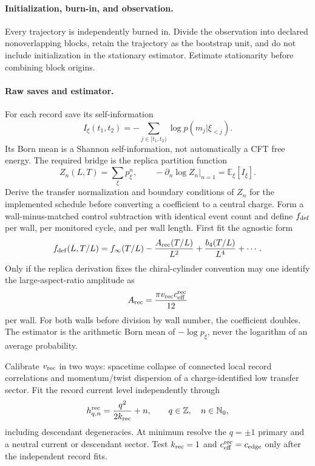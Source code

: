 \documentclass[aps,prx,onecolumn,nofootinbib,superscriptaddress,longbibliography]{revtex4-2}
\newcommand{\mb}[1]{\mathbb{#1}}
\newcommand{\E}{\mathbb{E}}
\begin{document}
\paragraph{Initialization, burn-in, and observation.}
Every trajectory is independently burned in.  Divide the observation into declared
nonoverlapping blocks, retain the trajectory as the bootstrap unit, and do not include
initialization in the stationary estimator.  Estimate stationarity before combining block
origins.

\paragraph{Raw saves and estimator.}
For each record save its self-information
\begin{equation}
 I_\xi(t_1,t_2)=-\sum_{j\in[t_1,t_2)}\log p(m_j|\xi_{<j}).
 \label{eq:record-self-information}
\end{equation}
Its Born mean is a Shannon self-information, not automatically a CFT free energy.  The
required bridge is the replica partition function
\begin{equation}
 Z_n(L,T)=\sum_\xi p_\xi^n,
 \qquad
 -\left.\partial_n\log Z_n\right|_{n=1}=\E_\xi[I_\xi].
 \label{eq:record-replica-bridge}
\end{equation}
Derive the transfer normalization and boundary conditions of $Z_n$ for the implemented
schedule before converting a coefficient to a central charge.  Form a wall-minus-matched
control subtraction with identical event count and define $f_{\rm def}$ per wall,
per monitored cycle, and per wall length.  First fit the agnostic form
\begin{equation}
 f_{\rm def}(L,T/L)=f_\infty(T/L)-\frac{A_{\rm rec}(T/L)}{L^2}
 +\frac{b_4(T/L)}{L^4}+\cdots .
 \label{eq:record-self-information-fit}
\end{equation}
Only if the replica derivation fixes the chiral-cylinder convention may one identify the
large-aspect-ratio amplitude as
\begin{equation}
 A_{\rm rec}=\frac{\pi v_{\rm rec}c_{\rm eff}^{\rm rec}}{12}
 \label{eq:record-central-charge-conversion}
\end{equation}
per wall.  For both walls before division by wall number, the coefficient doubles.  The
estimator is the arithmetic Born mean of $-\log p_\xi$, never the logarithm of an average
probability.

Calibrate $v_{\rm rec}$ in two ways: spacetime collapse of connected local record
correlations and momentum/twist dispersion of a charge-identified low transfer sector.  Fit
the record current level independently through
\begin{equation}
 h^{\rm rec}_{q,n}=\frac{q^2}{2k_{\rm rec}}+n,
 \qquad q\in\mb Z,\quad n\in\mb N_0,
 \label{eq:u1tower}
\end{equation}
including descendant degeneracies.  At minimum resolve the $q=\pm1$ primary and a neutral
current or descendant sector.  Test $k_{\rm rec}=1$ and
$c_{\rm eff}^{\rm rec}=c_{\rm edge}$ only after the independent record fits.
\end{document}
